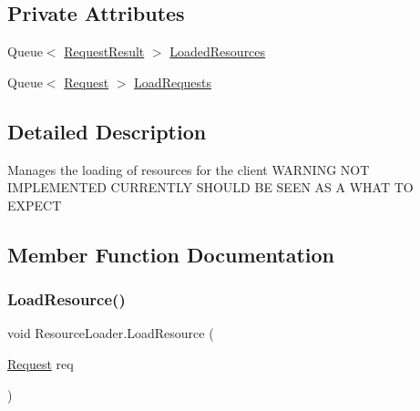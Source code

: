 \subsection*{Private Attributes}
\begin{DoxyCompactItemize}
\item 
Queue$<$ \mbox{\hyperlink{struct_resource_loader_1_1_request_result}{Request\+Result}} $>$ \mbox{\hyperlink{class_resource_loader_aac461f634dc821609293616d32e7288e}{Loaded\+Resources}}
\item 
Queue$<$ \mbox{\hyperlink{struct_resource_loader_1_1_request}{Request}} $>$ \mbox{\hyperlink{class_resource_loader_acd6d1957bdc4e0212991af05e3454633}{Load\+Requests}}
\end{DoxyCompactItemize}


\subsection{Detailed Description}
Manages the loading of resources for the client W\+A\+R\+N\+I\+NG N\+OT I\+M\+P\+L\+E\+M\+E\+N\+T\+ED C\+U\+R\+R\+E\+N\+T\+LY S\+H\+O\+U\+LD BE S\+E\+EN AS A W\+H\+AT TO E\+X\+P\+E\+CT 



\subsection{Member Function Documentation}
\mbox{\label{class_resource_loader_a088ef33ee82be6e64028b6b5512fad5d}} 
\subsubsection{\texorpdfstring{Load\+Resource()}{LoadResource()}}
{\footnotesize\ttfamily void Resource\+Loader.\+Load\+Resource (\begin{DoxyParamCaption}\item[{\mbox{\hyperlink{struct_resource_loader_1_1_request}{Request}}}]{req }\end{DoxyParamCaption})\hspace{0.3cm}{\ttfamily [private]}}

